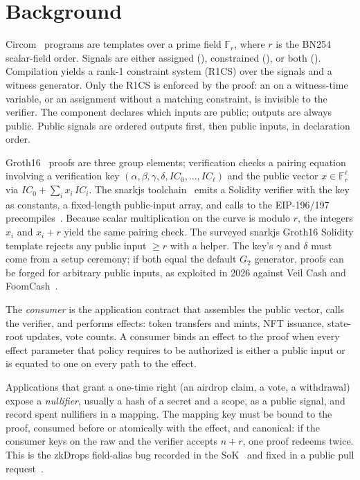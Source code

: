 \section{Background}\label{sec:background}

Circom~\cite{circom} programs are templates over a prime field $\mathbb{F}_r$,
where $r$ is the BN254 scalar-field order. Signals are either assigned
(\code{<--}), constrained (\code{===}), or both (\code{<==}). Compilation
yields a rank-1 constraint system (R1CS) over the signals and a witness
generator. Only the R1CS is enforced by the proof: an  on a
witness-time variable, or an \code{<--} assignment without a matching
constraint, is invisible to the verifier. The  component declares
which inputs are public; outputs are always public. Public signals are ordered
outputs first, then public inputs, in declaration order.

Groth16~\cite{groth16} proofs are three group elements; verification checks a
pairing equation involving a verification key $(\alpha,\beta,\gamma,\delta,
\mathit{IC}_0,\ldots,\mathit{IC}_\ell)$ and the public vector
$x\in\mathbb{F}_r^\ell$ via $\mathit{IC}_0+\sum_i x_i\,\mathit{IC}_i$. The
snarkjs toolchain~\cite{snarkjs} emits a Solidity verifier with the key as
constants, a fixed-length  public-input array, and calls to
the EIP-196/197 precompiles~\cite{eip197}. Because scalar multiplication on the
curve is modulo $r$, the integers $x_i$ and $x_i+r$ yield the same pairing
check. The surveyed snarkjs Groth16 Solidity template rejects any public input $\geq r$ with a
 helper. The key's $\gamma$ and $\delta$ must come from a
setup ceremony; if both equal the default $G_2$ generator, proofs can be forged
for arbitrary public inputs, as exploited in 2026 against Veil Cash and
FoomCash~\cite{veil-poc,foomcash}.

The \emph{consumer} is the application contract that assembles the public
vector, calls the verifier, and performs effects: token transfers and mints,
NFT issuance, state-root updates, vote counts. A consumer binds an effect to the
proof when every effect parameter that policy requires to be authorized is
either a public input or is equated to one on every path to the effect.

Applications that grant a one-time right (an airdrop claim, a vote, a
withdrawal) expose a \emph{nullifier}, usually a hash of a secret and a scope,
as a public signal, and record spent nullifiers in a mapping. The mapping key
must be bound to the proof, consumed before or atomically with the effect, and
canonical: if the consumer keys on the raw  and the verifier
accepts $n+r$, one proof redeems twice. This is the zkDrops field-alias bug
recorded in the SoK~\cite{sok-snarks} and fixed in a public pull
request~\cite{zkdrops-pr2}.
